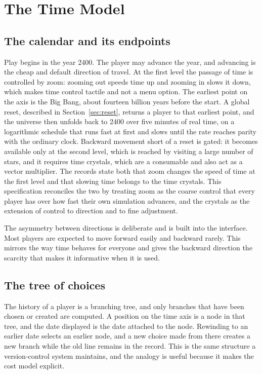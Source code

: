 \documentclass[11pt]{article}
\begin{document}
\section{The Time Model}
\label{sec:time}

\subsection{The calendar and its endpoints}

Play begins in the year 2400. The player may advance the year, and advancing is the cheap and default direction of travel. At the first level the passage of time is controlled by zoom: zooming out speeds time up and zooming in slows it down, which makes time control tactile and not a menu option. The earliest point on the axis is the Big Bang, about fourteen billion years before the start. A global reset, described in Section~\ref{sec:reset}, returns a player to that earliest point, and the universe then unfolds back to 2400 over five minutes of real time, on a logarithmic schedule that runs fast at first and slows until the rate reaches parity with the ordinary clock. Backward movement short of a reset is gated: it becomes available only at the second level, which is reached by visiting a large number of stars, and it requires time crystals, which are a consumable and also act as a vector multiplier. The records state both that zoom changes the speed of time at the first level and that slowing time belongs to the time crystals. This specification reconciles the two by treating zoom as the coarse control that every player has over how fast their own simulation advances, and the crystals as the extension of control to direction and to fine adjustment.

The asymmetry between directions is deliberate and is built into the interface. Most players are expected to move forward easily and backward rarely. This mirrors the way time behaves for everyone and gives the backward direction the scarcity that makes it informative when it is used.

\subsection{The tree of choices}

The history of a player is a branching tree, and only branches that have been chosen or created are computed. A position on the time axis is a node in that tree, and the date displayed is the date attached to the node. Rewinding to an earlier date selects an earlier node, and a new choice made from there creates a new branch while the old line remains in the record. This is the same structure a version-control system maintains, and the analogy is useful because it makes the cost model explicit.
\end{document}
